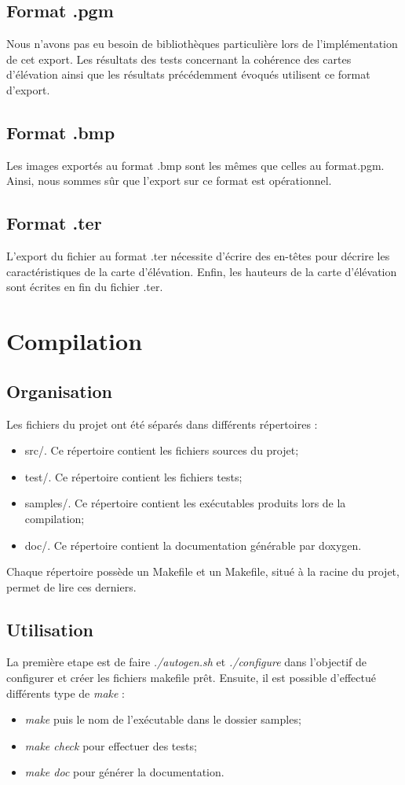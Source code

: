\subsection{Format .pgm}
Nous n'avons pas eu besoin de bibliothèques particulière lors de l'implémentation de cet export.
Les résultats des tests concernant la cohérence des cartes d'élévation ainsi que les résultats
précédemment évoqués utilisent ce format d'export.

\subsection{Format .bmp}
Les images exportés au format .bmp sont les mêmes que celles au format.pgm. 
Ainsi, nous sommes sûr que l'export sur ce format est opérationnel.

\subsection{Format .ter}
L'export du fichier au format .ter nécessite d'écrire des en-têtes pour décrire les caractéristiques 
de la carte d'élévation. Enfin, les hauteurs de la carte d'élévation sont écrites en fin du fichier .ter.

\section{Compilation}
\subsection{Organisation}
Les fichiers du projet ont été séparés dans différents répertoires :
\begin{itemize}
 \item src/. Ce répertoire contient les fichiers sources du projet;
 \item test/. Ce répertoire contient les fichiers tests;
 \item samples/. Ce répertoire contient les exécutables produits lors de la compilation;
 \item doc/. Ce répertoire contient la documentation générable par doxygen.
\end{itemize}
Chaque répertoire possède un Makefile et un Makefile, situé à la racine du projet, permet de lire ces derniers.

\subsection{Utilisation}
La première etape est de faire \emph{./autogen.sh} et \emph{./configure} dans l'objectif de configurer et créer les fichiers
 makefile prêt. Ensuite, il est possible d'effectué différents type de \emph{make} :
 \begin{itemize}
  \item \emph{make} puis le nom de l'exécutable dans le dossier samples;
  \item \emph{make check} pour effectuer des tests;
  \item \emph{make doc} pour générer la documentation.
 \end{itemize}


